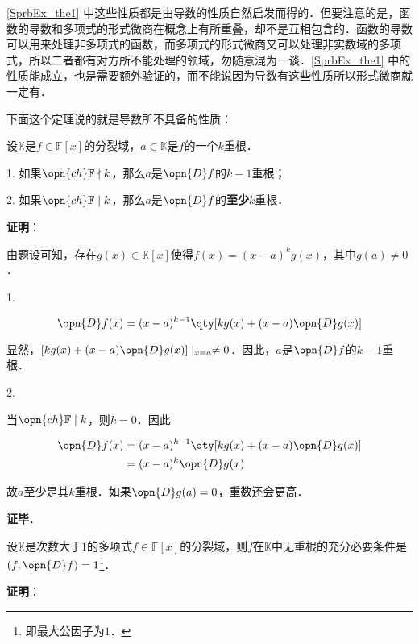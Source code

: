\autoref{SprbEx_the1} 中这些性质都是由导数的性质自然启发而得的．但要注意的是，函数的导数和多项式的形式微商在概念上有所重叠，却不是互相包含的．函数的导数可以用来处理非多项式的函数，而多项式的形式微商又可以处理非实数域的多项式，所以二者都有对方所不能处理的领域，勿随意混为一谈．\autoref{SprbEx_the1} 中的性质能成立，也是需要额外验证的，而不能说因为导数有这些性质所以形式微商就一定有．

下面这个定理说的就是导数所不具备的性质：

\begin{theorem}{}\label{SprbEx_the2}
设$\mathbb{K}$是$f\in\mathbb{F}[x]$的分裂域，$a\in\mathbb{K}$是$f$的一个$k$重根．

1. 如果$\opn{ch}\mathbb{F}\nmid k$，那么$a$是$\opn{D}f$的$k-1$重根；

2. 如果$\opn{ch}\mathbb{F}\mid k$，那么$a$是$\opn{D}f$的\textbf{至少}$k$重根．
\end{theorem}

\textbf{证明}：

由题设可知，存在$g(x)\in\mathbb{K}[x]$使得$f(x) = (x-a)^k g(x)$，其中$g(a)\neq 0$．

1. 

\begin{equation}
\opn{D}f(x)=(x-a)^{k-1}\qty[kg(x)+(x-a)\opn{D}g(x)]
\end{equation}

显然，$[kg(x)+(x-a)\opn{D}g(x)]\mid_{x=a}\neq 0$．因此，$a$是$\opn{D}f$的$k-1$重根．


2. 

当$\opn{ch}\mathbb{F}\mid k$，则$k=0$．因此

\begin{equation}
\begin{aligned}
\opn{D}f(x)&=(x-a)^{k-1}\qty[kg(x)+(x-a)\opn{D}g(x)]\\
&=(x-a)^k\opn{D}g(x)
\end{aligned}
\end{equation}

故$a$至少是其$k$重根．如果$\opn{D}g(a)=0$，重数还会更高．

\textbf{证毕}．



\begin{corollary}{}\label{SprbEx_cor1}
设$\mathbb{K}$是次数大于$1$的多项式$f\in\mathbb{F}[x]$的分裂域，则$f$在$\mathbb{K}$中无重根的充分必要条件是$(f, \opn{D}f)=1$\footnote{即最大公因子为$1$．}．
\end{corollary}

\textbf{证明}：

